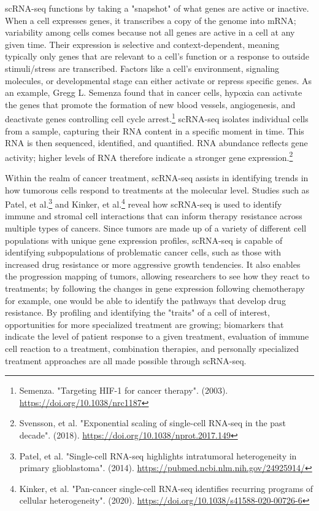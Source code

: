 \documentclass{article}
\begin{document}
scRNA-seq functions by taking a "snapshot" of what genes are active or inactive. When a cell expresses genes, it transcribes a copy of the genome into mRNA; variability among cells comes because not all genes are active in a cell at any given time. Their expression is selective and context-dependent, meaning typically only genes that are relevant to a cell's function or a response to outside stimuli/stress are transcribed. Factors like a cell's environment, signaling molecules, or developmental stage can either activate or repress specific genes. As an example, Gregg L. Semenza found that in cancer cells, hypoxia can activate the genes that promote the formation of new blood vessels, angiogenesis, and deactivate genes controlling cell cycle arrest.\footnote{Semenza. "Targeting HIF-1 for cancer therapy". (2003). \url{https://doi.org/10.1038/nrc1187}} scRNA-seq isolates individual cells from a sample, capturing their RNA content in a specific moment in time. This RNA is then sequenced, identified, and quantified. RNA abundance reflects gene activity; higher levels of RNA therefore indicate a stronger gene expression.\footnote{Svensson, et al. "Exponential scaling of single-cell RNA-seq in the past decade". (2018). \url{https://doi.org/10.1038/nprot.2017.149}}

Within the realm of cancer treatment, scRNA-seq assists in identifying trends in how tumorous cells respond to treatments at the molecular level. Studies such as Patel, et al.\footnote{Patel, et al. "Single-cell RNA-seq highlights intratumoral heterogeneity in primary glioblastoma". (2014). \url{https://pubmed.ncbi.nlm.nih.gov/24925914/}} and Kinker, et al.\footnote{Kinker, et al. "Pan-cancer single-cell RNA-seq identifies recurring programs of cellular heterogeneity". (2020). \url{https://doi.org/10.1038/s41588-020-00726-6}} reveal how scRNA-seq is used to identify immune and stromal cell interactions that can inform therapy resistance across multiple types of cancers. Since tumors are made up of a variety of different cell populations with unique gene expression profiles, scRNA-seq is capable of identifying subpopulations of problematic cancer cells, such as those with increased drug resistance or more aggressive growth tendencies. It also enables the progression mapping of tumors, allowing researchers to see how they react to treatments; by following the changes in gene expression following chemotherapy for example, one would be able to identify the pathways that develop drug resistance. By profiling and identifying the "traits" of a cell of interest, opportunities for more specialized treatment are growing; biomarkers that indicate the level of patient response to a given treatment, evaluation of immune cell reaction to a treatment, combination therapies, and personally specialized treatment approaches are all made possible through scRNA-seq.
\end{document}
